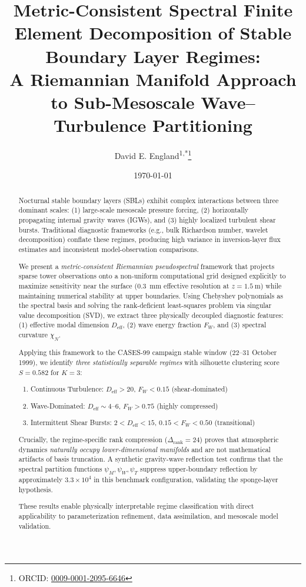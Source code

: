 \documentclass[11pt,a4paper]{article}
\title{Metric-Consistent Spectral Finite Element Decomposition of Stable Boundary Layer Regimes: \\
A Riemannian Manifold Approach to Sub-Mesoscale Wave--Turbulence Partitioning}
\author{David E. England\textsuperscript{1,*}\thanks{ORCID: \href{https://orcid.org/0009-0001-2095-6646}{0009-0001-2095-6646}}}
\affil{\textsuperscript{1}The University of Alabama in Huntsville, 301 Sparkman Drive Huntsville, AL 35899, USA}
\affil{\textsuperscript{*}Corresponding author: David.England@UAH.Edu}
\date{\today}
\begin{document}
\maketitle

\begin{abstract}
Nocturnal stable boundary layers (SBLs) exhibit complex interactions between three dominant scales: (1) large-scale mesoscale pressure forcing, (2) horizontally propagating internal gravity waves (IGWs), and (3) highly localized turbulent shear bursts. Traditional diagnostic frameworks (e.g., bulk Richardson number, wavelet decomposition) conflate these regimes, producing high variance in inversion-layer flux estimates and inconsistent model-observation comparisons.

We present a \emph{metric-consistent Riemannian pseudospectral} framework that projects sparse tower observations onto a non-uniform computational grid designed explicitly to maximize sensitivity near the surface (\SI{0.3}{\milli\meter} effective resolution at $z = \SI{1.5}{\meter}$) while maintaining numerical stability at upper boundaries. Using Chebyshev polynomials as the spectral basis and solving the rank-deficient least-squares problem via singular value decomposition (SVD), we extract three physically decoupled diagnostic features: (1) effective modal dimension $D_{\mathrm{eff}}$, (2) wave energy fraction $F_W$, and (3) spectral curvature $\chi_N$.

Applying this framework to the CASES-99 campaign stable window (22--31 October 1999), we identify \emph{three statistically separable regimes} with silhouette clustering score $S = 0.582$ for $K=3$:
\begin{enumerate}
  \item Continuous Turbulence: $D_{\mathrm{eff}} > 20$, $F_W < 0.15$ (shear-dominated)
  \item Wave-Dominated: $D_{\mathrm{eff}} \sim 4$--$6$, $F_W > 0.75$ (highly compressed)
  \item Intermittent Shear Bursts: $2 < D_{\mathrm{eff}} < 15$, $0.15 < F_W < 0.50$ (transitional)
\end{enumerate}

Crucially, the regime-specific rank compression ($\Delta_{\mathrm{rank}} = 24$) proves that atmospheric dynamics \emph{naturally occupy lower-dimensional manifolds} and are not mathematical artifacts of basis truncation. A synthetic gravity-wave reflection test confirms that the spectral partition functions $\psi_M, \psi_W, \psi_T$ suppress upper-boundary reflection by approximately $3.3\times 10^4$ in this benchmark configuration, validating the sponge-layer hypothesis.

These results enable physically interpretable regime classification with direct applicability to parameterization refinement, data assimilation, and mesoscale model validation.
\end{abstract}
\end{document}
